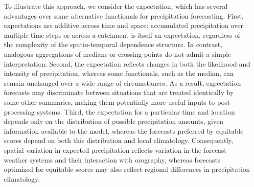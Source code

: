 \documentclass[10pt]{article} %
\theoremstyle{theorem}
\theoremstyle{definition}
\begin{document}
To illustrate this approach, we consider the expectation, which has several advantages over some alternative functionals for precipitation forecasting. First, expectations are additive across time and space: accumulated precipitation over multiple time steps or across a catchment is itself an expectation, regardless of the complexity of the spatio-temporal dependence structure. In contrast, analogous aggregations of medians or crossing points do not admit a simple interpretation. Second, the expectation reflects changes in both the likelihood and intensity of precipitation, whereas some functionals, such as the median, can remain unchanged over a wide range of circumstances. As a result, expectation forecasts may discriminate between situations that are treated identically by some other summaries, making them potentially more useful inputs to post-processing systems. Third, the expectation for a particular time and location depends only on the distribution of possible precipitation amounts, given information available to the model, whereas the forecasts preferred by equitable scores depend on both this distribution and local climatology. Consequently, spatial variation in expected precipitation reflects variation in the forecast weather systems and their interaction with orography, whereas forecasts optimized for equitable scores may also reflect regional differences in precipitation climatology.
\end{document}
